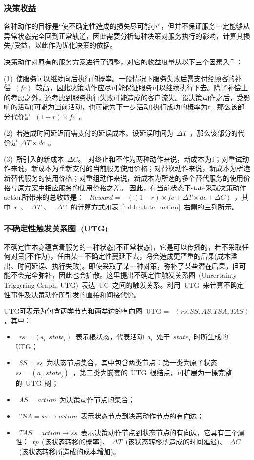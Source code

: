 \subsubsection{决策收益} \label{sec:reward_section}
各种动作的目标是“使不确定性造成的损失尽可能小”，但并不保证服务一定能够从异常状态完全回到正常轨道，因此需要分析每种决策对服务执行的影响，计算其损失/受益，以此作为优化决策的依据。

决策动作对原有的服务方案进行了调整，对它的收益度量从以下三个因素入手：

(1)~使服务可以继续向后执行的概率。一般情况下服务失败后需支付给顾客的补偿~$(fc)$~较高，因此决策动作应尽可能保证服务可以继续执行下去。除了补偿上的考虑之外，还考虑到服务执行失败可能造成的客户流失。设决策动作之后，受影响的活动(可能为当前活动，也可能为下一步活动)执行成功的概率为r，那么该部分代价是~$(1-r) \times fc$~。

(2)~若造成时间延迟而需支付的延误成本。设延误时间为~$\Delta T$~，那么该部分的代价是~$\Delta T \times dc$~。

(3)~所引入的新成本~$\Delta C$。~对终止和不作为两种动作来说，新成本为0；对重试动作来说，新成本为重新支付的当前服务使用价格；对替换动作来说，新成本为所选新替代服务的使用价格；对重组动作来说，新成本为所选的多个替代服务的使用价格与原方案中相应服务的使用价格之差。
因此，在当前状态下state采取决策动作action所带来的总收益是：
~$Reward =  - ((1 - r) \times fc + \Delta T \times dc + \Delta C)$~，其中~$r$~、~$\Delta T$~、 ~$\Delta C$~的计算方式如表~\ref{table:state_action}~右侧的三列所示。

\subsubsection{不确定性触发关系图~(UTG)~}
不确定性本身蕴含着服务的一种状态(不正常状态)，它是可以传播的，若不采取任何对策(不作为)，任由某一不确定性蔓延下去，将会造成更严重的后果(成本溢出、时间延误、执行失败)。即使采取了某一种对策，弥补了某些潜在后果，但可能不会完全弥补，因此也会扩散。这里提出不确定性触发关系图~(Uncertainty Triggering Graph, UTG)~表达~UC~之间的触发关系。利用~UTG~来计算不确定性事件及决策动作所引发的直接和间接代价。

UTG可表示为包含两类节点和两类边的有向图~UTG = ~$(rs, SS, AS, TSA, TAS)$，其中：
\begin{itemize}
\item ~$rs=(a_i, state_i)$~表示根状态，代表活动~$a_i$~处于~$state_i$~时所生成的UTG；
\item ~$SS={ss}$~为状态节点集合，其中包含两类节点：第一类为原子状态~$ss=(a_j, state_j)$~，第二类为嵌套的~UTG~根结点，可扩展为一棵完整的~UTG~树；
\item ~$AS={action}$~为决策动作节点的集合；
\item ~$TSA=ss \to action$~表示状态节点到决策动作节点的有向边；
\item ~$TAS=action \to ss$~表示决策动作节点到状态节点的有向边，它具有三个属性：~$tp$~(该状态转移的概率)、~$\Delta T$~(该状态转移所造成的时间延迟)、~$\Delta C$~(该状态转移所造成的成本增加)。
\end{itemize}

